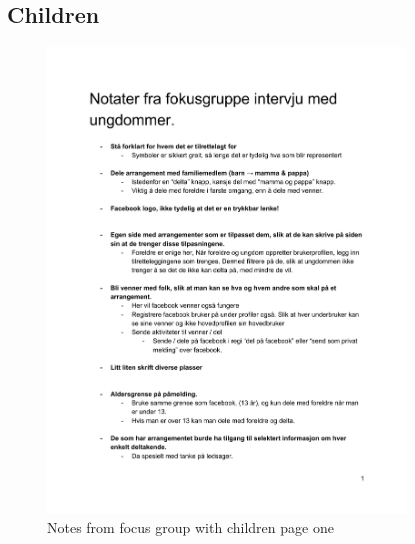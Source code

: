 \subsection{Children}
\begin{figure}[H]
\centering
    \includegraphics[width=0.85\textwidth]{fig/focusgroup/FGChildren_1.pdf}
    \caption{Notes from focus group with children page one}
    \label{Children_1}
\end{figure}

